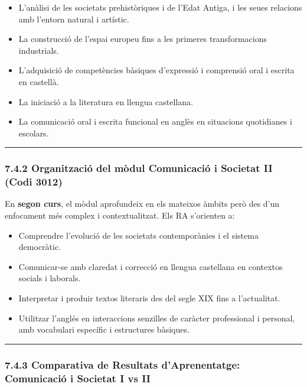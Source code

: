\documentclass[
  paper=a4,
  ,captions=tableheading
]{scrartcl}
\providecommand{\tightlist}{%
  \setlength{\itemsep}{0pt}\setlength{\parskip}{0pt}}
\begin{document}
\begin{itemize}
\tightlist
\item
  L'anàlisi de les societats prehistòriques i de l'Edat Antiga, i les
  seues relacions amb l'entorn natural i artístic.
\item
  La construcció de l'espai europeu fins a les primeres transformacions
  industrials.
\item
  L'adquisició de competències bàsiques d'expressió i comprensió oral i
  escrita en castellà.
\item
  La iniciació a la literatura en llengua castellana.
\item
  La comunicació oral i escrita funcional en anglès en situacions
  quotidianes i escolars.
\end{itemize}

\begin{center}\rule{0.5\linewidth}{0.5pt}\end{center}

\hypertarget{organitzaciuxf3-del-muxf2dul-comunicaciuxf3-i-societat-ii-codi-3012}{%
\subsubsection{7.4.2 Organització del mòdul Comunicació i Societat II
(Codi
3012)}\label{organitzaciuxf3-del-muxf2dul-comunicaciuxf3-i-societat-ii-codi-3012}}

En \textbf{segon curs}, el mòdul aprofundeix en els mateixos àmbits però
des d'un enfocament més complex i contextualitzat. Els RA s'orienten a:

\begin{itemize}
\tightlist
\item
  Comprendre l'evolució de les societats contemporànies i el sistema
  democràtic.
\item
  Comunicar-se amb claredat i correcció en llengua castellana en
  contextos socials i laborals.
\item
  Interpretar i produir textos literaris des del segle XIX fins a
  l'actualitat.
\item
  Utilitzar l'anglés en interaccions senzilles de caràcter professional
  i personal, amb vocabulari específic i estructures bàsiques.
\end{itemize}

\begin{center}\rule{0.5\linewidth}{0.5pt}\end{center}

\hypertarget{comparativa-de-resultats-daprenentatge-comunicaciuxf3-i-societat-i-vs-ii}{%
\subsubsection{7.4.3 Comparativa de Resultats d'Aprenentatge:
Comunicació i Societat I vs
II}\label{comparativa-de-resultats-daprenentatge-comunicaciuxf3-i-societat-i-vs-ii}}
\end{document}
